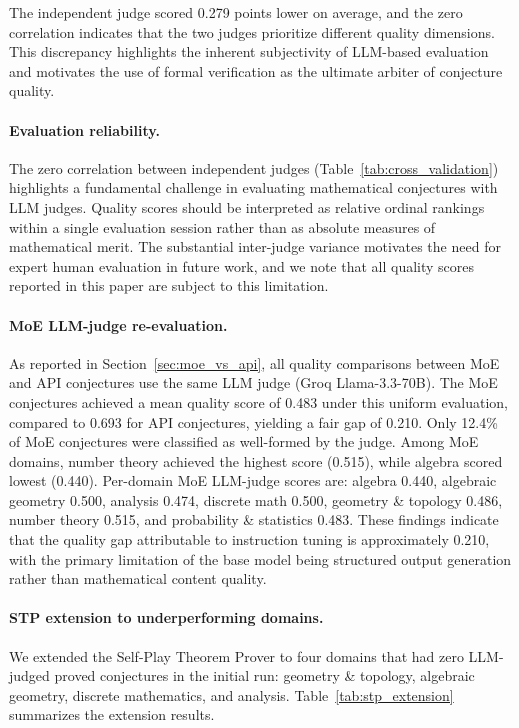 \documentclass[11pt,a4paper]{article}
\begin{document}
The independent judge scored 0.279 points lower on average, and the zero correlation indicates that the two judges prioritize different quality dimensions. This discrepancy highlights the inherent subjectivity of LLM-based evaluation and motivates the use of formal verification as the ultimate arbiter of conjecture quality.

\paragraph{Evaluation reliability.}
The zero correlation between independent judges (Table~\ref{tab:cross_validation}) highlights a fundamental challenge in evaluating mathematical conjectures with LLM judges. Quality scores should be interpreted as relative ordinal rankings within a single evaluation session rather than as absolute measures of mathematical merit. The substantial inter-judge variance motivates the need for expert human evaluation in future work, and we note that all quality scores reported in this paper are subject to this limitation.

\paragraph{MoE LLM-judge re-evaluation.}
As reported in Section~\ref{sec:moe_vs_api}, all quality comparisons between MoE and API conjectures use the same LLM judge (Groq Llama-3.3-70B). The MoE conjectures achieved a mean quality score of 0.483 under this uniform evaluation, compared to 0.693 for API conjectures, yielding a fair gap of 0.210. Only 12.4\% of MoE conjectures were classified as well-formed by the judge. Among MoE domains, number theory achieved the highest score (0.515), while algebra scored lowest (0.440). Per-domain MoE LLM-judge scores are: algebra 0.440, algebraic geometry 0.500, analysis 0.474, discrete math 0.500, geometry \& topology 0.486, number theory 0.515, and probability \& statistics 0.483. These findings indicate that the quality gap attributable to instruction tuning is approximately 0.210, with the primary limitation of the base model being structured output generation rather than mathematical content quality.

\paragraph{STP extension to underperforming domains.}
We extended the Self-Play Theorem Prover to four domains that had zero LLM-judged proved conjectures in the initial run: geometry \& topology, algebraic geometry, discrete mathematics, and analysis. Table~\ref{tab:stp_extension} summarizes the extension results.
\end{document}

